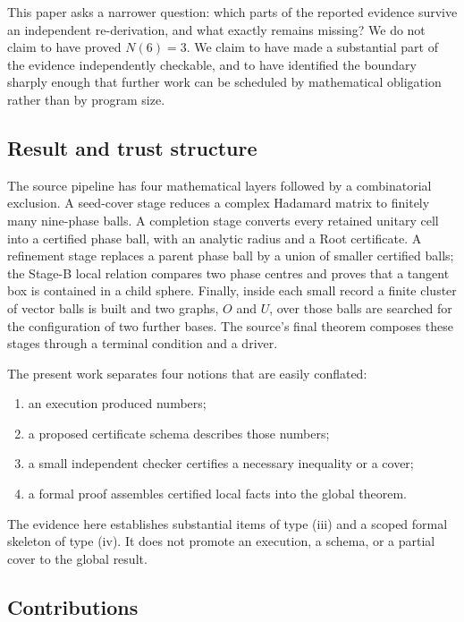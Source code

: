 \documentclass[10pt]{article}
\theoremstyle{definition}
\begin{document}
This paper asks a narrower question: which parts of the reported evidence survive an independent re-derivation, and what exactly remains missing? We do not claim to have proved $N(6)=3$. We claim to have made a substantial part of the evidence independently checkable, and to have identified the boundary sharply enough that further work can be scheduled by mathematical obligation rather than by program size.

\subsection{Result and trust structure}

The source pipeline has four mathematical layers followed by a combinatorial exclusion. A seed-cover stage reduces a complex Hadamard matrix to finitely many nine-phase balls. A completion stage converts every retained unitary cell into a certified phase ball, with an analytic radius and a Root certificate. A refinement stage replaces a parent phase ball by a union of smaller certified balls; the Stage-B local relation compares two phase centres and proves that a tangent box is contained in a child sphere. Finally, inside each small record a finite cluster of vector balls is built and two graphs, $O$ and $U$, over those balls are searched for the configuration of two further bases. The source's final theorem composes these stages through a terminal condition and a driver.

The present work separates four notions that are easily conflated:
\begin{enumerate}[label=(\roman*)]
\item an execution produced numbers;
\item a proposed certificate schema describes those numbers;
\item a small independent checker certifies a necessary inequality or a cover;
\item a formal proof assembles certified local facts into the global theorem.
\end{enumerate}
The evidence here establishes substantial items of type (iii) and a scoped formal skeleton of type (iv). It does not promote an execution, a schema, or a partial cover to the global result.

\subsection{Contributions}
\end{document}
